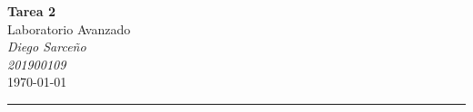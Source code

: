 




%


\textcolor{DS_Black}{
\begin{minipage}{0.85\textwidth}
    \begin{center}
        \textbf{\Large Tarea 2}\\
        \vspace{5pt}
        Laboratorio Avanzado \\
        \vspace{20pt}
        \textit{Diego Sarceño} \\
        \vspace{5pt}
        \footnotesize{\textit{201900109}} \\
        \vspace{5pt}
        \today
    \end{center}
\end{minipage}
\vspace{10pt}
\hrule
}